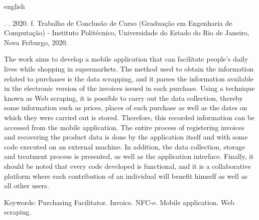 
\begin{resumo}[Abstract]
\begin{otherlanguage*}{english}
\begin{SingleSpace}

\noindent
\entradaAutor{}. \textit{\englishTitle{}}. 2020. \pageref{LastPage} f. Trabalho de Conclusão de Curso (Graduação em Engenharia de Computação) - Instituto Politécnico, Universidade do Estado do Rio de Janeiro, Nova Friburgo, 2020.
\vspace{\onelineskip}

\setlength{\parindent}{1.3cm}
The work aims to develop a mobile application that can facilitate people's daily lives while shopping in supermarkets. The method used to obtain the information related to purchases is the data scrapping, and it parses the information available in the electronic version of the invoices issued in each purchase. Using a technique known as Web scraping, it is possible to carry out the data collection, thereby some information such as prices, places of each purchase as well as the dates on which they were carried out is stored. Therefore, this recorded information can be accessed from the mobile application. The entire process of registering invoices and recovering the product data is done by the application itself and with some code executed on an external machine. In addition, the data collection, storage and treatment process is presented, as well as the application interface. Finally, it should be noted that every code developed is functional, and it is a collaborative platform where each contribution of an individual will benefit himself as well as all other users.

\vspace{\onelineskip}
\noindent Keywords: Purchasing Facilitator. Invoice. NFC-e. Mobile application. Web scraping.

\end{SingleSpace}
\end{otherlanguage*}
\end{resumo}